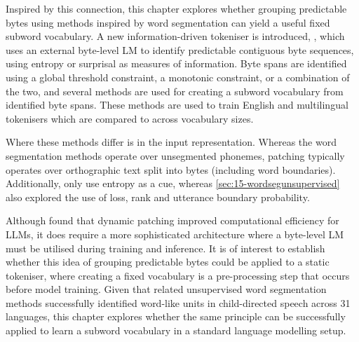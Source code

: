 Inspired by this connection, this chapter explores whether grouping predictable bytes using methods inspired by word segmentation can yield a useful fixed subword vocabulary. A new information-driven tokeniser is introduced, \tokname, which uses an external byte-level LM to identify predictable contiguous byte sequences, using entropy or surprisal as measures of information. Byte spans are identified using a global threshold constraint, a monotonic constraint, or a combination of the two, and several methods are used for creating a subword vocabulary from identified byte spans. These methods are used to train English and multilingual tokenisers which are compared to \bpe across vocabulary sizes. 




Where these methods differ is in the input representation. Whereas the word segmentation methods operate over unsegmented phonemes, patching typically operates over orthographic text split into bytes (including word boundaries). Additionally, \citet{pagnoni2024byte} only use entropy as a cue, whereas \cref{sec:15-wordsegunsupervised} also explored the use of loss, rank and utterance boundary probability.

Although \citet{pagnoni2024byte} found that dynamic patching improved computational efficiency for LLMs, it does require a more sophisticated architecture where a byte-level LM must be utilised during training and inference. It is of interest to establish whether this idea of grouping predictable bytes could be applied to a static tokeniser, where creating a fixed vocabulary is a pre-processing step that occurs before model training. Given that related unsupervised word segmentation methods successfully identified word-like units in child-directed speech across 31 languages, this chapter explores whether the same principle can be successfully applied to learn a subword vocabulary in a standard language modelling setup. 

